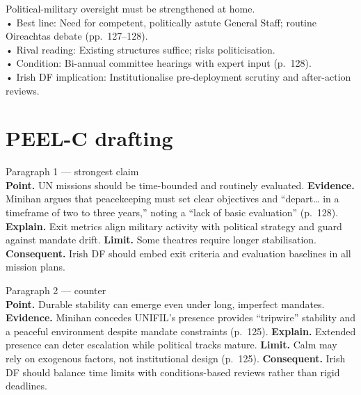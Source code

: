 Political-military oversight must be strengthened at home.\\
• Best line: Need for competent, politically astute General Staff; routine Oireachtas debate (pp.~127–128).\\
• Rival reading: Existing structures suffice; risks politicisation.\\
• Condition: Bi-annual committee hearings with expert input (p.~128).\\
• Irish DF implication: Institutionalise pre-deployment scrutiny and after-action reviews.\\

\section*{PEEL-C drafting}  

Paragraph 1 — strongest claim\\
\textbf{Point.} UN missions should be time-bounded and routinely evaluated.  
\textbf{Evidence.} Minihan argues that peacekeeping must set clear objectives and “depart… in a timeframe of two to three years,” noting a “lack of basic evaluation” (p.~128).  
\textbf{Explain.} Exit metrics align military activity with political strategy and guard against mandate drift.  
\textbf{Limit.} Some theatres require longer stabilisation.  
\textbf{Consequent.} Irish DF should embed exit criteria and evaluation baselines in all mission plans.  

Paragraph 2 — counter\\
\textbf{Point.} Durable stability can emerge even under long, imperfect mandates.  
\textbf{Evidence.} Minihan concedes UNIFIL’s presence provides “tripwire” stability and a peaceful environment despite mandate constraints (p.~125).  
\textbf{Explain.} Extended presence can deter escalation while political tracks mature.  
\textbf{Limit.} Calm may rely on exogenous factors, not institutional design (p.~125).  
\textbf{Consequent.} Irish DF should balance time limits with conditions-based reviews rather than rigid deadlines.  

